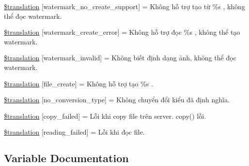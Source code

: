 \begin{DoxyCompactItemize}
\item 
\hyperlink{class_8upload_8vn___v_n_8php_a82d5853430ab72dc1f9799ec36144cc6}{\$translation} \mbox{[}\textquotesingle{}watermark\+\_\+no\+\_\+create\+\_\+support\textquotesingle{}\mbox{]} = \textquotesingle{}Không hỗ trợ tạo từ \%s , không thể đọc watermark.\textquotesingle{}
\item 
\hyperlink{class_8upload_8vn___v_n_8php_aabca0b65dadbc6184415c16375f284ca}{\$translation} \mbox{[}\textquotesingle{}watermark\+\_\+create\+\_\+error\textquotesingle{}\mbox{]} = \textquotesingle{}Không hỗ trợ đọc \%s , không thể tạo watermark.\textquotesingle{}
\item 
\hyperlink{class_8upload_8vn___v_n_8php_ac336e7a5701e47ba4a05e9e498a3cc44}{\$translation} \mbox{[}\textquotesingle{}watermark\+\_\+invalid\textquotesingle{}\mbox{]} = \textquotesingle{}Không biết định dạng ảnh, không thể đọc watermark.\textquotesingle{}
\item 
\hyperlink{class_8upload_8vn___v_n_8php_a1ecb4673e4fb69e06b3f20b65cecf30a}{\$translation} \mbox{[}\textquotesingle{}file\+\_\+create\textquotesingle{}\mbox{]} = \textquotesingle{}Không hỗ trợ tạo \%s .\textquotesingle{}
\item 
\hyperlink{class_8upload_8vn___v_n_8php_a4712d7ec28e9a7f17eb3338af2358363}{\$translation} \mbox{[}\textquotesingle{}no\+\_\+conversion\+\_\+type\textquotesingle{}\mbox{]} = \textquotesingle{}Không chuyển đổi kiểu đã định nghĩa.\textquotesingle{}
\item 
\hyperlink{class_8upload_8vn___v_n_8php_a783c9358bcf54a054545b50098bc679b}{\$translation} \mbox{[}\textquotesingle{}copy\+\_\+failed\textquotesingle{}\mbox{]} = \textquotesingle{}Lỗi khi copy file trên server. copy() lỗi.\textquotesingle{}
\item 
\hyperlink{class_8upload_8vn___v_n_8php_a01bea14c9fd5f353f62db44beabfcd42}{\$translation} \mbox{[}\textquotesingle{}reading\+\_\+failed\textquotesingle{}\mbox{]} = \textquotesingle{}Lỗi khi đọc file.\textquotesingle{}
\end{DoxyCompactItemize}


\subsection{Variable Documentation}
\hypertarget{class_8upload_8vn___v_n_8php_a1f198d410fecc3871ebdd468d343a5e3}{}
